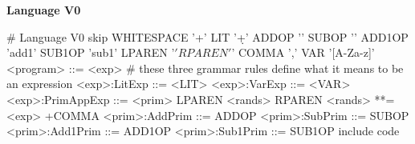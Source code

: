 \begin{minipage}[t]{\sw}
\slidenumber
\LARGE
{\bf Language V0}
\Large
\begin{qv}
# Language V0
skip WHITESPACE '\s+'
LIT '\d+'
ADDOP '\+'
SUBOP '\-'
ADD1OP 'add1'
SUB1OP 'sub1'
LPAREN '\('
RPAREN '\)'
COMMA ','
VAR '[A-Za-z]\w*'
%
<program>        ::= <exp>
# these three grammar rules define what it means to be an expression
<exp>:LitExp     ::= <LIT>
<exp>:VarExp     ::= <VAR>
<exp>:PrimAppExp ::= <prim> LPAREN <rands> RPAREN
<rands>          **= <exp> +COMMA
<prim>:AddPrim   ::= ADDOP
<prim>:SubPrim   ::= SUBOP
<prim>:Add1Prim  ::= ADD1OP
<prim>:Sub1Prim  ::= SUB1OP
%
include code
\end{qv}
\end{minipage}
